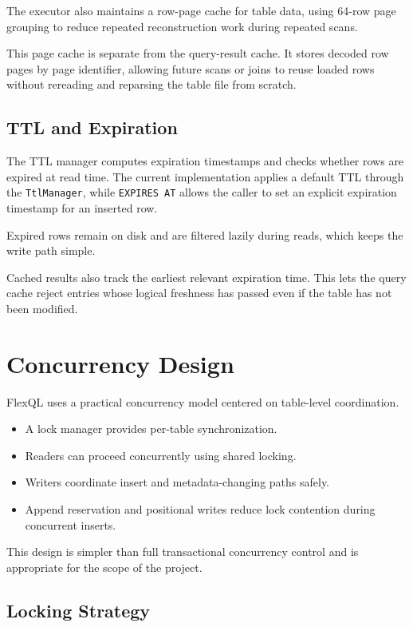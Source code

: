 \documentclass[12pt,a4paper]{article}
\begin{document}
The executor also maintains a row-page cache for table data, using 64-row page
grouping to reduce repeated reconstruction work during repeated scans.

This page cache is separate from the query-result cache. It stores decoded row
pages by page identifier, allowing future scans or joins to reuse loaded rows
without rereading and reparsing the table file from scratch.

\subsection{TTL and Expiration}

The TTL manager computes expiration timestamps and checks whether rows are
expired at read time. The current implementation applies a default TTL through
the \texttt{TtlManager}, while \texttt{EXPIRES AT} allows the caller to set an
explicit expiration timestamp for an inserted row.

Expired rows remain on disk and are filtered lazily during reads, which keeps
the write path simple.

Cached results also track the earliest relevant expiration time. This lets the
query cache reject entries whose logical freshness has passed even if the table
has not been modified.

\section{Concurrency Design}

FlexQL uses a practical concurrency model centered on table-level coordination.

\begin{itemize}[leftmargin=1.8em]
  \item A lock manager provides per-table synchronization.
  \item Readers can proceed concurrently using shared locking.
  \item Writers coordinate insert and metadata-changing paths safely.
  \item Append reservation and positional writes reduce lock contention during
        concurrent inserts.
\end{itemize}

This design is simpler than full transactional concurrency control and is
appropriate for the scope of the project.

\subsection{Locking Strategy}
\end{document}
